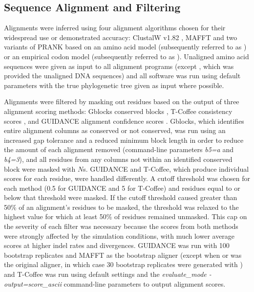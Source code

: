 \documentclass{article}
\begin{document}
\subsection*{Sequence Alignment and Filtering}

Alignments were inferred using four alignment algorithms chosen for
their widespread use or demonstrated accuracy: ClustalW v1.82
\citep{Thompson1994ClustalW}, MAFFT \citep{Katoh2005MAFFT} and two
variants of PRANK \citep{Loytynoja2005From} based on an amino acid
model (subsequently referred to as \pranka{}) or an empirical codon
model (subsequently referred to as \prankc{}). Unaligned amino acid
sequences were given as input to all alignment programs (except
\prankc{}, which was provided the unaligned DNA sequences) and all
software was run using default parameters with the true phylogenetic
tree given as input where possible.

Alignments were filtered by masking out residues based on the output
of three alignment scoring methods: Gblocks conserved blocks
\citep{Castresana2000Selection}, T-Coffee consistency scores
\citep{Notredame2000TCoffee,Notredame2003Using}, and GUIDANCE
alignment confidence scores \citep{Penn2010Alignment}. Gblocks, which
identifies entire alignment columns as conserved or not conserved, was
run using an increased gap tolerance and a reduced minimum block
length in order to reduce the amount of each alignment removed
(command-line parameters {\em b5=a} and {\em b4=3}), and all residues
from any columns not within an identified conserved block were masked
with $N$s. GUIDANCE and T-Coffee, which produce individual scores for
each residue, were handled differently. A cutoff threshold was chosen
for each method (0.5 for GUIDANCE and 5 for T-Coffee) and residues
equal to or below that threshold were masked. If the cutoff threshold
caused greater than 50\% of an alignment's residues to be masked, the
threshold was relaxed to the highest value for which at least 50\% of
residues remained unmasked. This cap on the severity of each filter
was necessary because the scores from both methods were strongly
affected by the simulation conditions, with much lower average scores
at higher indel rates and divergences. GUIDANCE was run with 100
bootstrap replicates and MAFFT as the bootstrap aligner (except when
\pranka{} or \prankc{} was the original aligner, in which case 30
bootstrap replicates were generated with \pranka{}) and T-Coffee was
run using default settings and the {\em evaluate\_mode
  -output=score\_ascii} command-line parameters to output alignment
scores.
\end{document}
